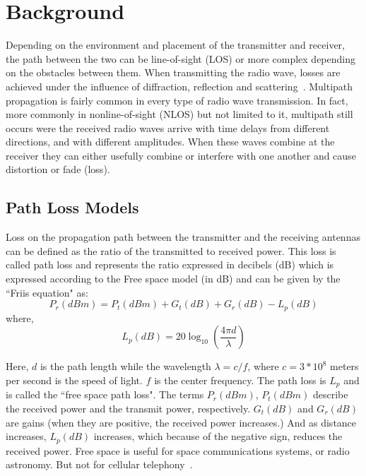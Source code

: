 
\section{Background}
Depending on the environment and placement of the transmitter and receiver, the path between the two can be line-of-sight (LOS)
or more complex depending on the obstacles between them. When transmitting the radio wave, losses are achieved under the 
influence of diffraction, reflection and scattering~\cite{b4}. Multipath propagation is fairly common in every type
of radio wave transmission. In fact, more commonly in nonline-of-sight (NLOS) but not limited to it, multipath still occurs were the
received radio waves arrive with time delays from different directions, and with different amplitudes. When these waves combine
at the receiver they can either usefully combine or interfere with one another and cause distortion or fade (loss). 

\subsection{Path Loss Models}
Loss on the propagation path between the transmitter and the receiving antennas can be defined as the ratio of the transmitted to 
received power. This loss is called path loss and represents the ratio expressed in decibels (dB) which is expressed according to 
the Free space model (in dB) and can be given by the ``Friis equation" as: 
\begin{equation}
P_r(dBm) = P_t(dBm) + G_t(dB) + G_r(dB) - L_p(dB)\label{eq1}
\end{equation}
where,
\begin{equation}
L_p(dB) = 20\log_{10}(\frac{4\pi d}{\lambda})\label{eq2}
\end{equation}

Here, $d$ is the path length while the wavelength $\lambda = c / f$, where $c=3*10^8$ meters per second is the speed of light. 
$f$ is the center frequency. The path loss is $L_p$ and is called the ``free space path loss". The terms $P_r(dBm)$, $P_t(dBm)$
describe the received power and the transmit power, respectively. $G_t(dB)$ and $G_r(dB)$ are gains (when they are positive, 
the received power increases.) And as distance increases, $L_p(dB)$ increases, which because of the negative sign, reduces 
the received power. Free space is useful for space communications systems, or radio astronomy. But not for cellular 
telephony~\cite{b5}.

